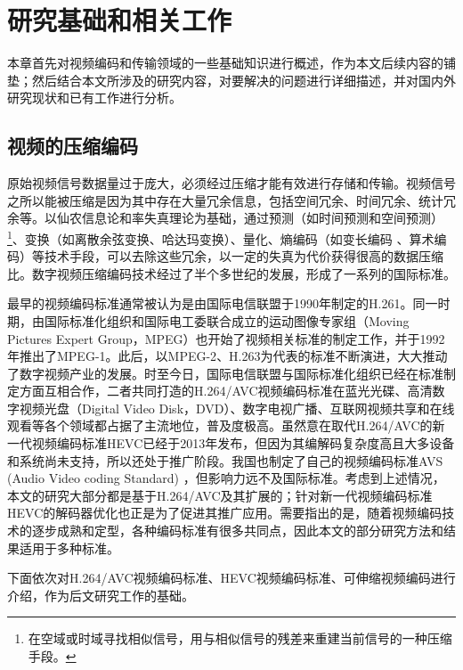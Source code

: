 \chapter{研究基础和相关工作}

本章首先对视频编码和传输领域的一些基础知识进行概述，作为本文后续内容的铺垫；然后结合本文所涉及的研究内容，对要解决的问题进行详细描述，并对国内外研究现状和已有工作进行分析。

\section{视频的压缩编码}

原始视频信号数据量过于庞大，必须经过压缩才能有效进行存储和传输。视频信号之所以能被压缩是因为其中存在大量冗余信息，包括空间冗余、时间冗余、统计冗余等\supercite{Gao-book-2010}。以仙农信息论\supercite{Shannon-1948}和率失真理论\supercite{Berger-book-1984}为基础，通过预测（如时间预测和空间预测）\footnote{在空域或时域寻找相似信号，用与相似信号的残差来重建当前信号的一种压缩手段。}、变换（如离散余弦变换\supercite{Rao-1990}、哈达玛变换\supercite{Pratt-1969}）、量化\supercite{Gray-TIT1997}、熵编码（如变长编码\supercite{Huffman-1952} 、算术编码\supercite{Rissanen-1979}）等技术手段，可以去除这些冗余，以一定的失真为代价获得很高的数据压缩比。数字视频压缩编码技术经过了半个多世纪的发展，形成了一系列的国际标准。

最早的视频编码标准通常被认为是由国际电信联盟于1990年制定的H.261\supercite{H.261}。同一时期，由国际标准化组织和国际电工委联合成立的运动图像专家组（Moving Pictures Expert Group，MPEG）也开始了视频相关标准的制定工作，并于1992年推出了MPEG-1\supercite{MPEG1}。此后，以MPEG-2\supercite{MPEG2}、H.263\supercite{H.263}为代表的标准不断演进，大大推动了数字视频产业的发展。时至今日，国际电信联盟与国际标准化组织已经在标准制定方面互相合作，二者共同打造的H.264/AVC视频编码标准在蓝光光碟、高清数字视频光盘（Digital Video Disk，DVD）、数字电视广播、互联网视频共享和在线观看等各个领域都占据了主流地位，普及度极高。虽然意在取代H.264/AVC的新一代视频编码标准HEVC已经于2013年发布，但因为其编解码复杂度高且大多设备和系统尚未支持，所以还处于推广阶段。我国也制定了自己的视频编码标准AVS (Audio Video coding Standard) \supercite{AVS}，但影响力远不及国际标准。考虑到上述情况，本文的研究大部分都是基于H.264/AVC及其扩展的；针对新一代视频编码标准HEVC的解码器优化也正是为了促进其推广应用。需要指出的是，随着视频编码技术的逐步成熟和定型，各种编码标准有很多共同点，因此本文的部分研究方法和结果适用于多种标准。

下面依次对H.264/AVC视频编码标准、HEVC视频编码标准、可伸缩视频编码进行介绍，作为后文研究工作的基础。

